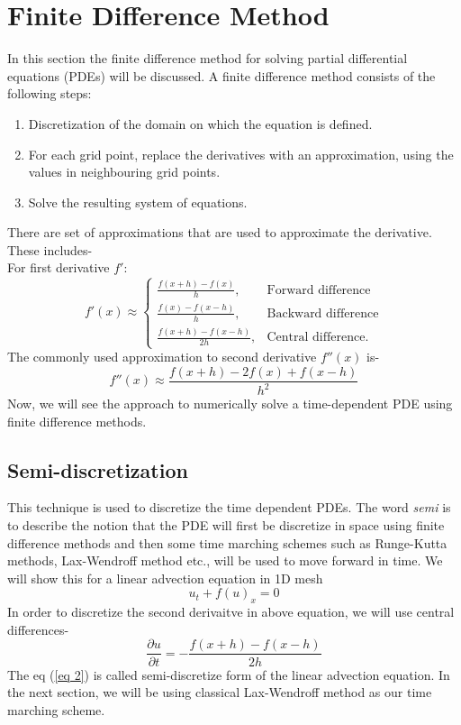 \section{Finite Difference Method} \label{fdm}
In this section the finite difference method for solving partial differential equations (PDEs) will be discussed. A finite difference method consists of the following steps:
\begin{enumerate}
    \item Discretization of the domain on which the equation is defined.
    \item For each grid point, replace the derivatives with an approximation, using the values in neighbouring grid points.
    \item Solve the resulting system of equations.
\end{enumerate}
There are set of approximations that are used to approximate the derivative. These includes-\\
For first derivative $f'$:
\begin{equation} \label{eqfdm}
f'(x)\approx 
\begin{cases}
    \frac{f(x+h) - f(x)}{h}, & \text{Forward difference }\\
    \frac{f(x) - f(x-h)}{h}, & \text{Backward difference} \\
    \frac{f(x+h) - f(x-h)}{2h}, & \text{Central difference.}
\end{cases}
\end{equation}
The commonly used approximation to second derivative $f''(x)$ is-
\begin{equation} \label{eqdouble}
    f''(x) \approx \frac{f(x+h) - 2f(x) + f(x-h)}{h^2}
\end{equation}
Now, we will see the approach to numerically solve a time-dependent PDE using finite difference methods.
\subsection{Semi-discretization}
This technique is used to discretize the time dependent PDEs. The word {\em semi} is to describe the notion that the PDE will first be discretize in space using finite difference methods and then some time marching schemes such as Runge-Kutta methods, Lax-Wendroff method etc., will be used to move forward in time. We will show this for a linear advection equation in 1D mesh
\begin{equation} \label{1}
    u_t + f(u)_x = 0
\end{equation}
In order to discretize the second derivaitve in above equation, we will use central differences-
\begin{equation} \label{eq 2}
    \frac{\partial u}{\partial t} = -\frac{f(x+h) - f(x-h)}{2h}
\end{equation}
The eq (\ref{eq 2}) is called semi-discretize form of the linear advection equation. In the next section, we will be using classical Lax-Wendroff method as our time marching scheme.

